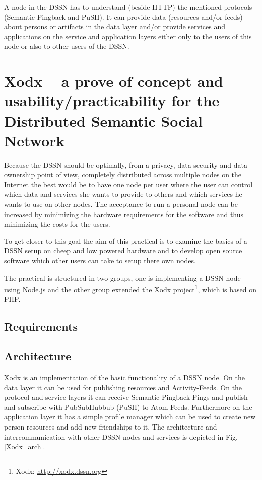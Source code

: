 \documentclass{llncs}
\begin{document}
A node in the DSSN has to understand (beside HTTP) the mentioned protocols (Semantic Pingback and PuSH).
It can provide data (resources and/or feeds) about persons or artifacts in the data layer and/or provide services and applications on the service and application layers either only to the users of this node or also to other users of the DSSN.

\section{Xodx -- a prove of concept and usability/practicability for the Distributed Semantic Social Network}
Because the DSSN should be optimally, from a privacy, data security and data ownership point of view, completely distributed across multiple nodes on the Internet the best would be to have one node per user where the user can control which data and services she wants to provide to others and which services he wants to use on other nodes.
The acceptance to run a personal node can be increased by minimizing the hardware requirements for the software and thus minimizing the costs for the users.

To get closer to this goal the aim of this practical is to examine the basics of a DSSN setup on cheep and low powered hardware and to develop open source software which other users can take to setup there own nodes.

The practical is structured in two groups, one is implementing a DSSN node using Node.js and the other group extended the Xodx project\footnote{Xodx: \url{http://xodx.dssn.org}}, which is based on PHP.

\subsection{Requirements}

\subsection{Architecture}
Xodx is an implementation of the basic functionality of a DSSN node.
On the data layer it can be used for publishing resources and Activity-Feeds.
On the protocol and service layers it can receive Semantic Pingback-Pings and publish and subscribe with PubSubHubbub (PuSH) to Atom-Feeds.
Furthermore on the application layer it has a simple profile manager which can be used to create new person resources and add new friendships to it.
The architecture and intercommunication with other DSSN nodes and services is depicted in Fig. \ref{Xodx_arch}.
\end{document}
